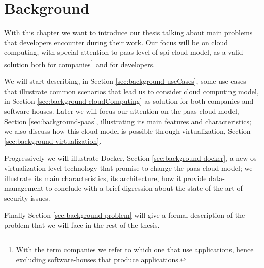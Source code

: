 %
%
\chapter{Background}
\label{cap:background}
With this chapter we want to introduce our thesis talking about main problems that developers
encounter during their work. Our focus will be on cloud computing, with special
attention to \ac{paas} level of \ac{spi} cloud model, as a valid solution both for
companies\footnote{With the term companies we refer to which one that use applications, hence
excluding software-houses that produce applications.} and for developers.

We will start describing, in Section \ref{sec:background-useCases}, some use-cases that illustrate
common scenarios that lead us to consider cloud computing model, in Section 
\ref{sec:background-cloudComputing} as solution for both companies and software-houses.
Later we will focus our attention on the \ac{paas} cloud model, Section \ref{sec:background-paas}, 
illustrating its main features and characteristics; we also discuss how this cloud model is possible
through virtualization, Section \ref{sec:background-virtualization}.

Progressively we will illustrate Docker, Section \ref{sec:background-docker}, a new \acs{os}
virtualization level technology that promise to change the \ac{paas} cloud model; we illustrate its
main characteristics, its architecture, how it provide data-management to conclude with a brief digression
about the state-of-the-art of security issues.

Finally Section \ref{sec:background-problem} will give a formal description of the problem that we
will face in the rest of the thesis.















%
